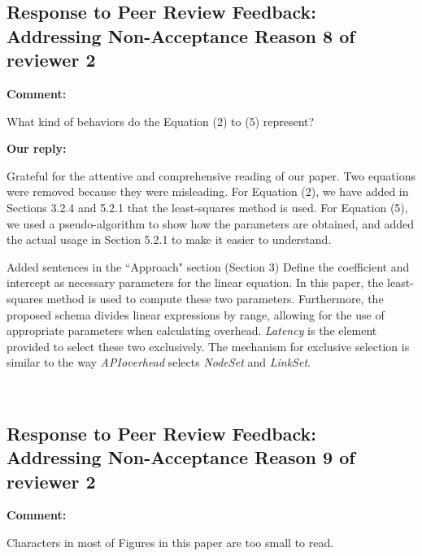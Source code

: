 \documentclass{article}
\begin{document}
\newpage
\subsection{Response to Peer Review Feedback: Addressing Non-Acceptance Reason 8 of reviewer 2}
\begin{flushleft}
  \textbf{Comment:}
\end{flushleft}
\begin{adjustwidth}{1cm}{1cm}  %
    What kind of behaviors do the Equation (2) to (5) represent?
\end{adjustwidth}
    
\begin{flushleft}
  \textbf{Our reply:}
\end{flushleft}
\begin{adjustwidth}{1cm}{1cm}  %
    Grateful for the attentive and comprehensive reading of our paper.
    Two equations were removed because they were misleading.
    For Equation (2), we have added in Sections 3.2.4 and 5.2.1 that the least-squares method is used.
    For Equation (5), we used a pseudo-algorithm to show how the parameters are obtained, and added the actual usage in Section 5.2.1 to make it easier to understand.
\end{adjustwidth}
\bigskip
\begin{itembox}[|]{Added sentences in the ``Approach" section (Section 3)}
    Define the coefficient and intercept as necessary parameters for the linear equation.
    In this paper, the least-squares method is used to compute these two parameters.
    Furthermore, the proposed schema divides linear expressions by range, allowing for the use of appropriate parameters when calculating overhead.
    \textit{Latency} is the element provided to select these two exclusively. The mechanism for exclusive selection is similar to the way \textit{APIoverhead} selects \textit{NodeSet} and \textit{LinkSet}.
\end{itembox}\\

\newpage
\subsection{Response to Peer Review Feedback: Addressing Non-Acceptance Reason 9 of reviewer 2}
\begin{flushleft}
  \textbf{Comment:}
\end{flushleft}
\begin{adjustwidth}{1cm}{1cm}  %
    Characters in most of Figures in this paper are too small to read.
\end{adjustwidth}
    
\end{document}
